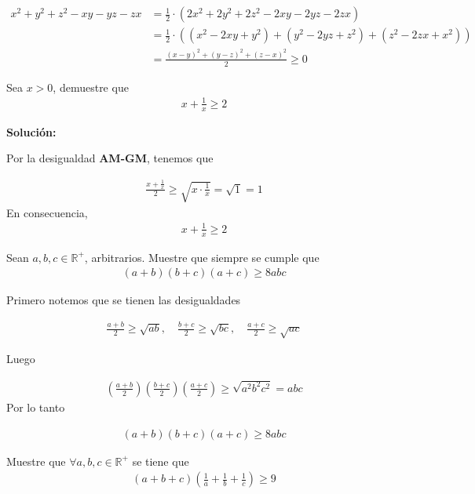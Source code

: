 \documentclass[12pt]{book}
\begin{document}
\begin{align*}
    x^2+y^2+z^2-xy-yz-zx&= \frac{1}{2}\cdot(2x^2+2y^2+2z^2-2xy-2yz-2zx) \\
    &=\frac{1}{2}\cdot((x^2-2xy+y^2)+(y^2-2yz+z^2)+(z^2-2zx+x^2)) \\
    &=\frac{(x-y)^2+(y-z)^2+(z-x)^2}{2} \geq 0
\end{align*}
\begin{prob}{}{}
Sea $x>0$, demuestre que 
\begin{align*}
    x+\frac{1}{x}\geq 2
\end{align*}
\end{prob}
\textbf{Solución:}

Por la desigualdad \textbf{AM-GM}, tenemos que 

\begin{align*}
    \frac{x+\frac{1}{x}}{2}\geq \sqrt{x \cdot \frac{1}{x}}=\sqrt{1}=1
\end{align*}
En consecuencia,
\begin{align*}
    x+\frac{1}{x}\geq 2
\end{align*}

\begin{prob}{}{}
    Sean $a,b,c \in \mathbb{R}^+$, arbitrarios. Muestre que siempre se cumple que 
    \begin{align*}
    (a+b)(b+c)(a+c)\geq8abc
\end{align*}
\end{prob}

Primero notemos que se tienen las desigualdades

\begin{align*}
    \frac{a+b}{2}\geq\sqrt{ab}, \quad \frac{b+c}{2}\geq \sqrt{bc}, \quad \frac{a+c}{2}\geq\sqrt{ac}
\end{align*}

Luego

\begin{align*}
    \left(\frac{a+b}{2}\right) \left(\frac{b+c}{2}\right) \left(\frac{a+c}{2}\right)\geq \sqrt{a^2 b^2 c^2}=abc
\end{align*}
Por lo tanto

\begin{align*}
      (a+b)(b+c)(a+c)\geq8abc
\end{align*}

\begin{prob}{}{}
    Muestre que $\forall a,b,c \in \mathbb{R}^+$ se tiene que 
    \begin{align*}
        (a+b+c)\left(\frac{1}{a}+\frac{1}{b}+\frac{1}{c}\right) \geq 9
    \end{align*}
\end{prob}
\end{document}
